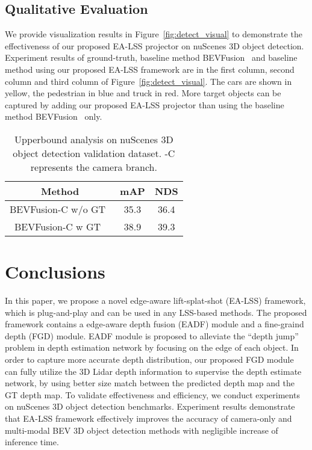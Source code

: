 \documentclass[letterpaper]{article} \usepackage[submission]{aaai24}  \usepackage{times}  \usepackage{helvet}  \usepackage{courier}  \usepackage[hyphens]{url}  \usepackage{graphicx} \urlstyle{rm} \def\UrlFont{\rm}  \usepackage{natbib}  \usepackage{caption} \frenchspacing  \setlength{\pdfpagewidth}{8.5in} \setlength{\pdfpageheight}{11in} \usepackage{algorithm}
\begin{document}
\subsection{Qualitative Evaluation}
We provide visualization results in Figure~\ref{fig:detect_visual} to demonstrate the effectiveness of our proposed EA-LSS projector on nuScenes 3D object detection.
Experiment results of ground-truth, baseline method BEVFusion~\cite{liu2022bevfusion} and baseline method using our proposed EA-LSS framework are in the first column, second column and third column of Figure~\ref{fig:detect_visual}. The cars are shown in yellow, the pedestrian in blue and truck in red.  More target objects can be captured by adding our proposed EA-LSS projector than using the baseline method BEVFusion~\cite{liu2022bevfusion} only. 






\begin{table}
\begin{center}
\begin{tabular}{c|c|c}
\hline
Method & mAP  & NDS \\
\hline
BEVFusion-C w/o GT~\cite{liu2022bevfusion} & 35.3 & 36.4 \\
BEVFusion-C w GT~\cite{liu2022bevfusion} &  38.9 & 39.3 \\
\hline
\end{tabular}
\end{center}
\caption{Upperbound analysis on nuScenes 3D object detection validation dataset. -C represents the camera branch.}
\label{table:ceiling_analysis}
\end{table}

\section{Conclusions}


In this paper, we propose a novel edge-aware lift-splat-shot (EA-LSS) framework, which is plug-and-play and can be used in any LSS-based methods. 
The proposed framework contains a edge-aware depth fusion (EADF) module and a fine-graind depth (FGD) module.
EADF module is proposed to alleviate the ``depth jump'' problem in depth estimation network by focusing on the edge of each object.
In order to capture more accurate depth distribution, our proposed FGD module can fully utilize the 3D Lidar depth information to supervise the depth estimate network, by using better size match between the predicted depth map and the GT depth map.
To validate effectiveness and efficiency, we conduct experiments on nuScenes 3D object detection benchmarks. Experiment results demonstrate that EA-LSS framework effectively improves the accuracy of camera-only and multi-modal BEV 3D object detection methods with negligible increase of inference time. 


\end{document}

